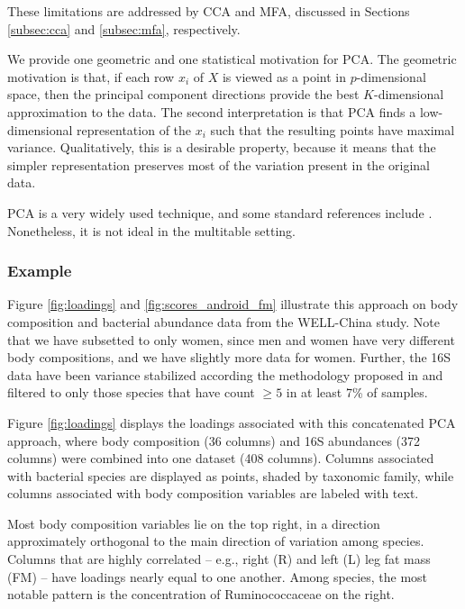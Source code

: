 \documentclass[utf8]{frontiersFPHY} %
\begin{document}
These limitations are addressed by CCA and MFA, discussed in Sections
\ref{subsec:cca} and \ref{subsec:mfa}, respectively.

We provide one geometric and one statistical motivation for PCA. The geometric
motivation is that, if each row $x_{i}$ of $X$ is viewed as a point in
$p$-dimensional space, then the principal component directions provide the best
$K$-dimensional approximation to the data. The second interpretation is that PCA
finds a low-dimensional representation of the $x_{i}$ such that the resulting
points have maximal variance. Qualitatively, this is a desirable property,
because it means that the simpler representation preserves most of the variation
present in the original data.

PCA is a very widely used technique, and some standard references include
\citep{friedman2001elements, mardia1980multivariate, pages2014multiple}.
Nonetheless, it is not ideal in the multitable setting.

\subsubsection{Example}
\label{subsubsec:pca_example}

Figure \ref{fig:loadings} and \ref{fig:scores_android_fm} illustrate this
approach on body composition and bacterial abundance data from the WELL-China
study. Note that we have subsetted to only women, since men and women have very
different body compositions, and we have slightly more data for women. Further,
the 16S data have been variance stabilized according the methodology proposed in
\citep{Anders2010} and filtered to only those species that have count $\geq 5$
in at least 7\% of samples.

Figure \ref{fig:loadings} displays the loadings associated with this
concatenated PCA approach, where body composition (36 columns) and 16S
abundances (372 columns) were combined into one dataset (408 columns). Columns
associated with bacterial species are displayed as points, shaded by taxonomic
family, while columns associated with body composition variables are labeled
with text.

Most body composition variables lie on the top right, in a direction
approximately orthogonal to the main direction of variation among species.
Columns that are highly correlated -- e.g., right (R) and left (L) leg fat mass
(FM) -- have loadings nearly equal to one another. Among species, the most
notable pattern is the concentration of Ruminococcaceae on the right.
\end{document}
